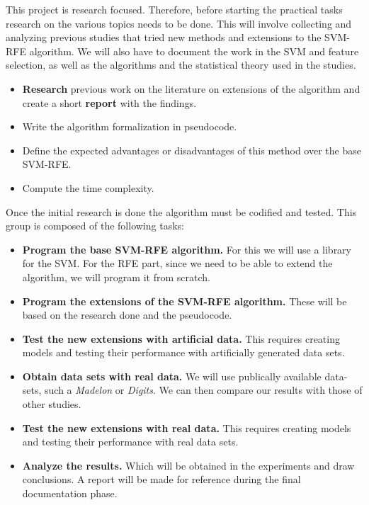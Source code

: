 This project is research focused. Therefore, before starting the practical tasks research on the various topics needs to be done. This will involve collecting and analyzing previous studies that tried new methods and extensions to the SVM-RFE algorithm. We will also have to document the work in the SVM and feature selection, as well as the algorithms and the statistical theory used in the studies.

\begin{itemize}
    \item \textbf{Research} previous work on the literature on extensions of the algorithm and create a short \textbf{report} with the findings.
    \item Write the algorithm formalization in pseudocode.
    \item Define the expected advantages or disadvantages of this method over the base SVM-RFE.
    \item Compute the time complexity.
\end{itemize}

Once the initial research is done the algorithm must be codified and tested. This group is composed of the following tasks:

\begin{itemize}
    \item \textbf{Program the base SVM-RFE algorithm.} For this we will use a library for the SVM. For the RFE part, since we need to be able to extend the algorithm, we will program it from scratch.
    \item \textbf{Program the extensions of the SVM-RFE algorithm.} These will be based on the research done and the pseudocode.
    \item \textbf{Test the new extensions with artificial data.} This requires creating models and testing their performance with artificially generated data sets.
    \item \textbf{Obtain data sets with real data.} We will use publically available data-sets, such a \emph{Madelon} or \emph{Digits}. We can then compare our results with those of other studies.
    \item \textbf{Test the new extensions with real data.} This requires creating models and testing their performance with real data sets.
    \item \textbf{Analyze the results.} Which will be obtained in the experiments and draw conclusions. A report will be made for reference during the final doc\-u\-men\-ta\-tion phase.
\end{itemize}

